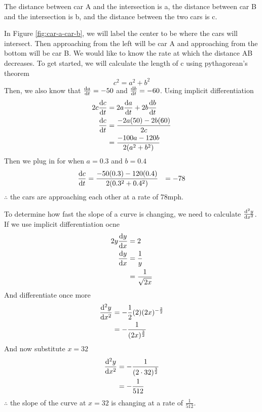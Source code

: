 \documentclass[working]{tuftebook}
\begin{document}
\begin{solutions}
        \begin{marginfigure}
            \centering
            \caption{The distance between car A and the intersection is a, the distance between car B and the intersection is b, and the distance between the two cars is c.}
            \label{fig:car-a-car-b}
        \end{marginfigure}
    
    \item{In Figure \ref{fig:car-a-car-b}, we will label the center to be where the cars will intersect. Then approaching from the left will be car A and approaching from the bottom will be car B. We would like to know the rate at which the distance AB decreases. To get started, we will calculate the length of c using pythagorean's theorem
            \[
                c^2=a^2+b^2
            \]
            Then, we also know that $ \dv{a}{t}=-50$ and $ \dv{b}{t}=-60$. Using implicit differentiation 
        \begin{align*}
            2c \dv{c}{t}&= 2a \dv{a}{t}+ 2b \dv{b}{t}\\ 
            \dv{c}{t}&= \frac{-2a(50)-2b(60)}{2c}\\ 
                     &= \frac{-100a-120b}{2(a^2+b^2)}
        \end{align*}
        Then we plug in for when $a=0.3$ and $b=0.4$
        \begin{align*}
            \dv{c}{t}&= \frac{-50(0.3)-120(0.4)}{2(0.3^2+0.4^2)}
                     &=-78 
        \end{align*}
        $\therefore$ the cars are approaching each other at a rate of 78mph.
        }

        \item{To determine how fast the slope of a curve is changing, we need to calculate $ \dv[2]{y}{x}$. If we use implicit differentiation ocne 
                \begin{align*}
                    2y \dv{y}{x}&= 2\\
                    \dv{y}{x}&= \frac{1}{y}\\ 
                             &= \frac{1}{ \sqrt{2x}}
                \end{align*}
                And differentiate once more 
                \begin{align*}
                    \dv[2]{y}{x}&= -\frac{1}{2}(2)(2x)^{- \frac{3}{2}}\\ 
                                &=-\frac{1}{(2x)^{ \frac{3}{2}}} 
                \end{align*}
                And now substitute $x=32$ 
                \begin{align*}
                    \dv[2]{y}{x}&=- \frac{1}{(2\cdot 32)^ \frac{3}{2}}\\ 
                                &=-\frac{1}{512}
                \end{align*}
                $\therefore$ the slope of the curve at $x=32$ is changing at a rate of $ \frac{1}{512}$. 
            }
\end{solutions}
\end{document}
